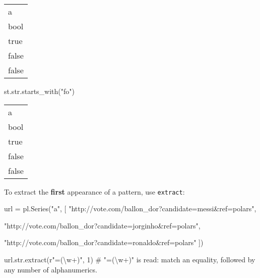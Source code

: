 \documentclass[
  letterpaper,
  DIV=11,
  numbers=noendperiod]{scrartcl}
\newenvironment{Shaded}{\begin{snugshade}}{\end{snugshade}}
\newcommand{\BuiltInTok}[1]{\textcolor[rgb]{0.00,0.23,0.31}{#1}}
\newcommand{\CommentTok}[1]{\textcolor[rgb]{0.37,0.37,0.37}{#1}}
\newcommand{\DecValTok}[1]{\textcolor[rgb]{0.68,0.00,0.00}{#1}}
\newcommand{\NormalTok}[1]{\textcolor[rgb]{0.00,0.23,0.31}{#1}}
\newcommand{\OperatorTok}[1]{\textcolor[rgb]{0.37,0.37,0.37}{#1}}
\newcommand{\StringTok}[1]{\textcolor[rgb]{0.13,0.47,0.30}{#1}}
\newcommand{\VerbatimStringTok}[1]{\textcolor[rgb]{0.13,0.47,0.30}{#1}}
\begin{document}
\begin{longtable}[]{@{}l@{}}
\toprule()
a \\
bool \\
\midrule()
\endhead
true \\
false \\
false \\
\bottomrule()
\end{longtable}

\begin{Shaded}
\begin{Highlighting}[]
\NormalTok{st.}\BuiltInTok{str}\NormalTok{.starts\_with(}\StringTok{"fo"}\NormalTok{)}
\end{Highlighting}
\end{Shaded}

\begin{longtable}[]{@{}l@{}}
\toprule()
a \\
bool \\
\midrule()
\endhead
true \\
false \\
false \\
\bottomrule()
\end{longtable}

To extract the \textbf{first} appearance of a pattern, use
\texttt{extract}:

\begin{Shaded}
\begin{Highlighting}[]
\NormalTok{url }\OperatorTok{=}\NormalTok{ pl.Series(}\StringTok{"a"}\NormalTok{, [}
            \StringTok{"http://vote.com/ballon\_dor?candidate=messi\&ref=polars"}\NormalTok{,}

            \StringTok{"http://vote.com/ballon\_dor?candidate=jorginho\&ref=polars"}\NormalTok{,}

            \StringTok{"http://vote.com/ballon\_dor?candidate=ronaldo\&ref=polars"}
\NormalTok{            ])}
\end{Highlighting}
\end{Shaded}

\begin{Shaded}
\begin{Highlighting}[]
\NormalTok{url.}\BuiltInTok{str}\NormalTok{.extract(}\VerbatimStringTok{r"=(\textbackslash{}w+)"}\NormalTok{, }\DecValTok{1}\NormalTok{) }\CommentTok{\# "=(\textbackslash{}w+)" is read: match an equality, followed by any number of alphanumerics.}
\end{Highlighting}
\end{Shaded}
\end{document}
